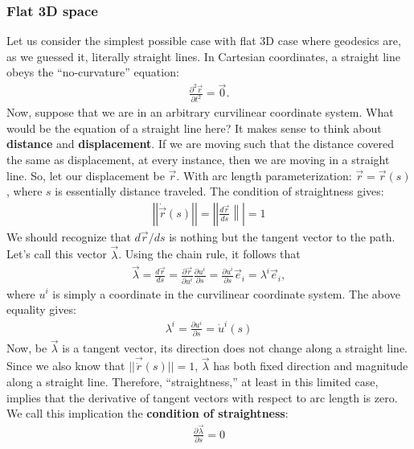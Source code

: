 \documentclass{article}
\theoremstyle{definition}
\begin{document}
\subsubsection{Flat 3D space}
Let us consider the simplest possible case with flat 3D case where geodesics are, as we guessed it, literally straight lines. In Cartesian coordinates, a straight line obeys the ``no-curvature'' equation:
\begin{align*}
\frac{\partial^2 \vec{r}}{\partial t^2} = \vec{0}.
\end{align*}
Now, suppose that we are in an arbitrary curvilinear coordinate system. What would be the equation of a straight line here? It makes sense to think about \textbf{distance} and \textbf{displacement}. If we are moving such that the distance covered the same as displacement, at every instance, then we are moving in a straight line. So, let our displacement be $\vec{r}$. With arc length parameterization: $\vec{r} = \vec{r}(s)$, where $s$ is essentially distance traveled. The condition of straightness gives:
\begin{align*}
\boxed{\left|\left| \dot{\vec{r}}(s) \right|\right| = \left|\left| \frac{d\vec{r}}{ds} \right\|\right| = 1 }
\end{align*}
We should recognize that $d\vec{r}/ds$ is nothing but the tangent vector to the path. Let's call this vector $\vec{\lambda}$. Using the chain rule, it follows that
\begin{align*}
\vec{\lambda} = \frac{d\vec{r}}{ds} = \frac{\partial \vec{r}}{\partial u^i}\frac{\partial u^i}{\partial s} = \frac{\partial u^i}{\partial s}\vec{e}_i = \lambda^i\vec{e}_i,
\end{align*}
where $u^i$ is simply a coordinate in the curvilinear coordinate system. The above equality gives:
\begin{align*}
\boxed{\lambda^i = \frac{\partial u^i}{\partial s} = \dot{u}^i(s)}
\end{align*}
Now, be $\vec{\lambda}$ is a tangent vector, its direction does not change along a straight line. Since we also know that $\vert\vert \vec{\dot{r}}(s) \vert\vert = 1$, $\vec{\lambda}$ has both fixed direction and magnitude along a straight line. Therefore, ``straightness,'' at least in this limited case, implies that the derivative of tangent vectors with respect to arc length is zero. We call this implication the \textbf{condition of straightness}:
\begin{align*}
\boxed{\frac{\partial \vec{\lambda}}{\partial s} = 0}
\end{align*}
\end{document}
